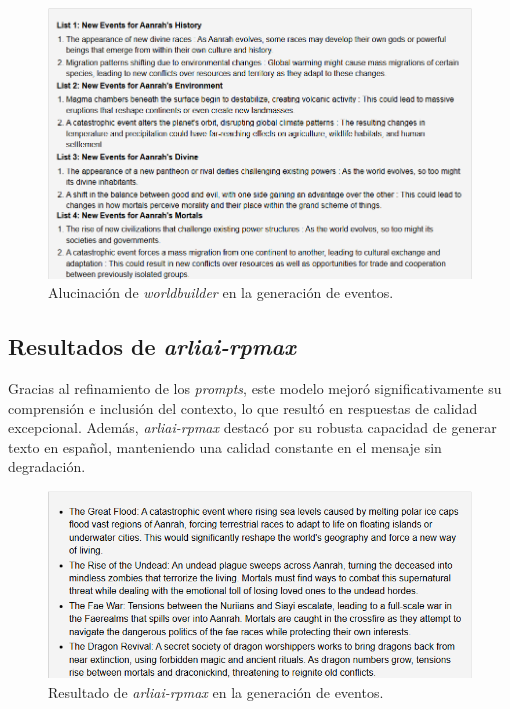 \begin{figure}[htbp]
	\centering
	\includegraphics[width=1\textwidth]{./Figures/worldbuilder-hallucination-events.png}
	\caption{Alucinación de \textit{worldbuilder} en la generación de eventos.}
	\label{fig:worldbuilder-hallucination}
\end{figure}

\subsection{Resultados de \textit{arliai-rpmax}}
Gracias al refinamiento de los \textit{prompts},
este modelo mejoró significativamente su comprensión e inclusión del contexto,
lo que resultó en respuestas de calidad excepcional.
Además, \textit{arliai-rpmax} destacó por su robusta capacidad de generar texto en español,
manteniendo una calidad constante en el mensaje sin degradación.

\begin{figure}[htbp]
	\centering
	\includegraphics[width=1\textwidth]{./Figures/rpmax-prompt-events.png}
	\caption{Resultado de \textit{arliai-rpmax} en la generación de eventos.}
	\label{fig:rpmax-events}
\end{figure}

